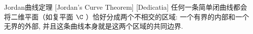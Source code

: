 \documentclass[UTF8]{ctexart}
\begin{document}







        \begin{thm}
            [UUID]
            {Jordan曲线定理}
            [Jordan's Curve Theorem]
            [Dedicatia]
            任何一条简单闭曲线都会将二维平面（如复平面 \(\C\) ）恰好分成两个不相交的区域: 一个有界的内部和一个无界的外部, 并且这条曲线本身就是这两个区域的共同边界. 
        \end{thm}
\end{document}
